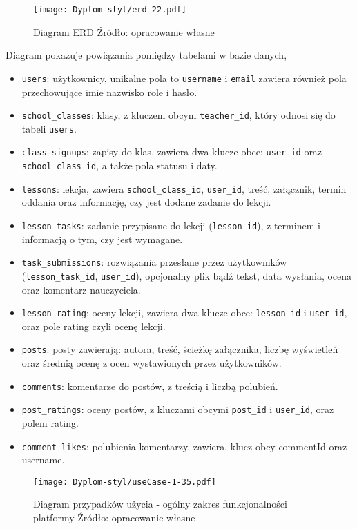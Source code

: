 \begin{figure}[H]
  \centering
  \texttt{[image: Dyplom-styl/erd-22.pdf]}
  \caption{Diagram ERD Źródło: opracowanie własne}
  \label{fig:system_klas_zadan}
\end{figure}
Diagram pokazuje powiązania pomiędzy tabelami w bazie danych, \begin{itemize}
    \item \texttt{users}: użytkownicy, unikalne pola to \texttt{username} i \texttt{email} zawiera również pola przechowujące imie nazwisko role i hasło.
    \item \texttt{school\_classes}: klasy, z kluczem obcym \texttt{teacher\_id}, który odnosi się do tabeli \texttt{users}.
    \item \texttt{class\_signups}: zapisy do klas, zawiera dwa klucze obce: \texttt{user\_id} oraz \texttt{school\_class\_id}, a także pola statusu i daty.
    \item \texttt{lessons}: lekcja, zawiera \texttt{school\_class\_id}, \texttt{user\_id}, treść, załącznik, termin oddania oraz informację, czy jest dodane zadanie do lekcji.
    \item \texttt{lesson\_tasks}: zadanie przypisane do lekcji (\texttt{lesson\_id}), z terminem i informacją o tym, czy jest wymagane.
    \item \texttt{task\_submissions}: rozwiązania przesłane przez użytkowników (\texttt{lesson\_task\_id}, \texttt{user\_id}), opcjonalny plik bądź tekst, data wysłania, ocena oraz komentarz nauczyciela.
    \item \texttt{lesson\_rating}: oceny lekcji, zawiera dwa klucze obce: \texttt{lesson\_id} i \texttt{user\_id}, oraz pole rating czyli ocenę lekcji.
    \item \texttt{posts}: posty zawierają: autora, treść, ścieżkę załącznika, liczbę wyświetleń oraz średnią ocenę z ocen wystawionych przez użytkowników.
    \item \texttt{comments}: komentarze do postów, z treścią i liczbą polubień.
    \item \texttt{post\_ratings}: oceny postów, z kluczami obcymi \texttt{post\_id} i \texttt{user\_id}, oraz polem rating.
    \item \texttt{comment\_likes}: polubienia komentarzy, zawiera, klucz obcy commentId oraz username.
\end{itemize}
\begin{figure}[H]
  \centering
  \texttt{[image: Dyplom-styl/useCase-1-35.pdf]}
  \caption{Diagram przypadków użycia -  ogólny zakres funkcjonalności platformy  Źródło: opracowanie własne}
  \label{fig:system_klas_zadan}
\end{figure}
